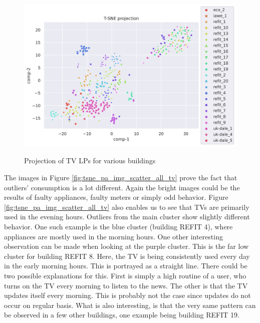 \begin{figure}[H]
	\centering
	\caption{Projection of TV LPs for various buildings}
	\includegraphics[width=1.2\textwidth]{Figures/TSNE/TSNE_per_appliance/all/scatter_all_television.png}
	\label{fig:tsne_pa_scatter_all_tv}
\end{figure}

The images in Figure \ref{fig:tsne_pa_img_scatter_all_tv} prove the fact that outliers' consumption is a lot different.
Again the bright images could be the results of faulty appliances, faulty meters or simply odd behavior.
Figure \ref{fig:tsne_pa_img_scatter_all_tv} also enables us to see that TVs are primarily used 
in the evening hours. Outliers from the main cluster show slightly different behavior. One such 
example is the blue cluster (building REFIT 4), where appliances are mostly used in the morning hours. 
One other interesting observation can be made when looking at the purple cluster. This is the far low cluster for building REFIT 8.
Here, the TV is being consistently used every day in the early morning hours.
This is portrayed as a straight line.
There could be two possible explanations for this.
First is simply a high routine of a user, who turns on the TV every morning to listen to the news.
The other is that the TV updates itself every morning. This is probably not the case since updates do not occur on regular basis.
What is also interesting, is that the very same pattern can be observed in a few other buildings, one example being building REFIT 19.

